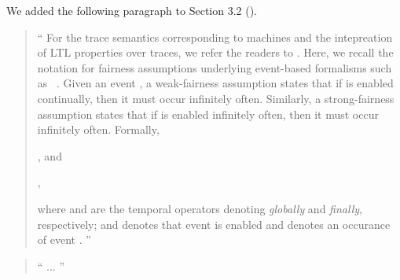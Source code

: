 \documentclass{response}
\begin{document}
\begin{comment}{Reviewer \#1}
• p. 21 Could you give a formal definition or at least a reference of your 
strong fairness.
\end{comment}

\begin{response}
  We added the following paragraph to Section 3.2 (\EventB).
  \begin{quote}
    ``  For the trace semantics corresponding to \mbox{\EventB} machines and
  the intepreation of LTL properties over traces, we refer the readers
  to \mbox{\cite{hoang2016ltl}}.  Here, we recall the notation for
  fairness assumptions underlying event-based formalisms such as
  \mbox{\EventB~\cite{lamport1977proving,hudon16:_unit_b_method}}. Given
  an event \mbox{}, a weak-fairness assumption
  \mbox{} states that if \mbox{}
  is enabled continually, then it must occur infinitely often.
  Similarly, a strong-fairness assumption \mbox{}
  states that if \mbox{} is enabled infinitely often,
  then it must occur infinitely often. Formally,
\begin{center}
  , and

  ,
\end{center}
  where \mbox{} and \mbox{} are the
  temporal operators denoting \emph{globally} and \emph{finally},
  respectively; and \mbox{} denotes that
  event \mbox{} is enabled and
  \mbox{\EventBInline{[e]}} denotes an occurance of event
  \mbox{}.
   ''
  \end{quote}
\end{response}

\begin{comment}{Reviewer \#1}
• p.22 Could you comment on your definition of anticipated events. Why the set 
of convergent events is necessary to recall just before?
\end{comment}

\begin{response}
  \begin{quote}
    `` ...
   ''
  \end{quote}
\end{response}

\begin{comment}{Reviewer \#1}
• p.22 Proof of Convergence an Anticipation I wonder if this paragraph should 
not be before because you use such arguments before just after stating Theorem 
2.
\end{comment}
\end{document}

